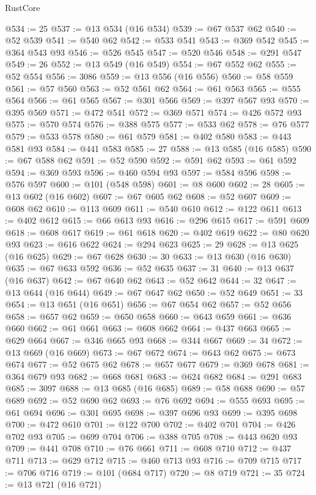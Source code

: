 \begin{lexlean}{RustCore}
\begin{coremodule}
@534 := 25
@537 := @13 @534 (@16 @534)
@539 := @67 @537 @62
@540 := @52 @539
@541 := @540 @62
@542 := @533 @541
@543 := @369 @542
@545 := @364 @543 @93
@546 := @526 @545
@547 := @520 @546
@548 := @291 @547
@549 := 26
@552 := @13 @549 (@16 @549)
@554 := @67 @552 @62
@555 := @52 @554
@556 := 3086
@559 := @13 @556 (@16 @556)
@560 := @58 @559
@561 := @57 @560
@563 := @52 @561 @62
@564 := @61 @563
@565 := @555 @564
@566 := @61 @565
@567 := @301 @566
@569 := @397 @567 @93
@570 := @395 @569
@571 := @472 @541
@572 := @369 @571
@574 := @426 @572 @93
@575 := @570 @574
@576 := @388 @575
@577 := @533 @62
@578 := @76 @577
@579 := @533 @578
@580 := @61 @579
@581 := @402 @580
@583 := @443 @581 @93
@584 := @441 @583
@585 := 27
@588 := @13 @585 (@16 @585)
@590 := @67 @588 @62
@591 := @52 @590
@592 := @591 @62
@593 := @61 @592
@594 := @369 @593
@596 := @460 @594 @93
@597 := @584 @596
@598 := @576 @597
@600 := @101 (@548 @598)
@601 := @8 @600
@602 := 28
@605 := @13 @602 (@16 @602)
@607 := @67 @605 @62
@608 := @52 @607
@609 := @608 @62
@610 := @113 @609
@611 := @540 @610
@612 := @122 @611
@613 := @402 @612
@615 := @66 @613 @93
@616 := @296 @615
@617 := @591 @609
@618 := @608 @617
@619 := @61 @618
@620 := @402 @619
@622 := @80 @620 @93
@623 := @616 @622
@624 := @294 @623
@625 := 29
@628 := @13 @625 (@16 @625)
@629 := @67 @628
@630 := 30
@633 := @13 @630 (@16 @630)
@635 := @67 @633 @592
@636 := @52 @635
@637 := 31
@640 := @13 @637 (@16 @637)
@642 := @67 @640 @62
@643 := @52 @642
@644 := 32
@647 := @13 @644 (@16 @644)
@649 := @67 @647 @62
@650 := @52 @649
@651 := 33
@654 := @13 @651 (@16 @651)
@656 := @67 @654 @62
@657 := @52 @656
@658 := @657 @62
@659 := @650 @658
@660 := @643 @659
@661 := @636 @660
@662 := @61 @661
@663 := @608 @662
@664 := @437 @663
@665 := @629 @664
@667 := @346 @665 @93
@668 := @344 @667
@669 := 34
@672 := @13 @669 (@16 @669)
@673 := @67 @672
@674 := @643 @62
@675 := @673 @674
@677 := @52 @675 @62
@678 := @657 @677
@679 := @369 @678
@681 := @364 @679 @93
@682 := @668 @681
@683 := @624 @682
@684 := @291 @683
@685 := 3097
@688 := @13 @685 (@16 @685)
@689 := @58 @688
@690 := @57 @689
@692 := @52 @690 @62
@693 := @76 @692
@694 := @555 @693
@695 := @61 @694
@696 := @301 @695
@698 := @397 @696 @93
@699 := @395 @698
@700 := @472 @610
@701 := @122 @700
@702 := @402 @701
@704 := @426 @702 @93
@705 := @699 @704
@706 := @388 @705
@708 := @443 @620 @93
@709 := @441 @708
@710 := @76 @661
@711 := @608 @710
@712 := @437 @711
@713 := @629 @712
@715 := @460 @713 @93
@716 := @709 @715
@717 := @706 @716
@719 := @101 (@684 @717)
@720 := @8 @719
@721 := 35
@724 := @13 @721 (@16 @721)

\end{coremodule}
\end{lexlean}
